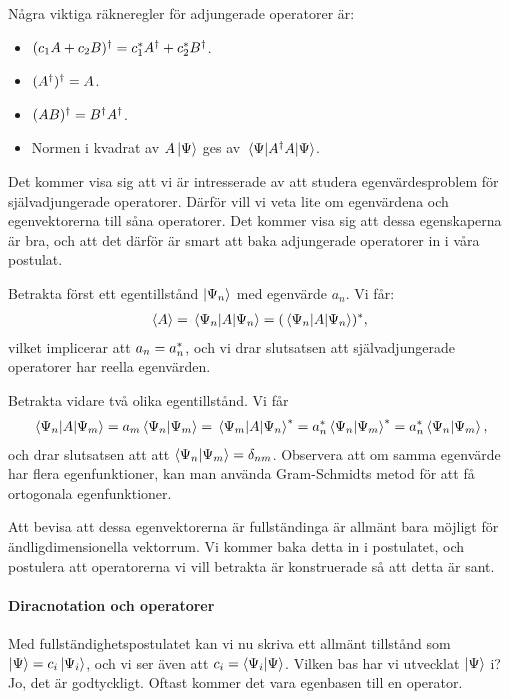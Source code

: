 Några viktiga räkneregler för adjungerade operatorer är:
\begin{itemize}
	\item $(c_{1}A + c_{2}B)^{\dagger} = c_{1}^{*}A^{\dagger} + c_{2}^{*}B^{\dagger}$.
	\item $(A^{\dagger})^{\dagger} = A$.
	\item $(AB)^{\dagger} = B^{\dagger}A^{\dagger}$.
	\item Normen i kvadrat av $A\ket{\Psi}$ ges av $\expval{A^{\dagger}A}{\Psi}$.
\end{itemize}

Det kommer visa sig att vi är intresserade av att studera egenvärdesproblem för självadjungerade operatorer. Därför vill vi veta lite om egenvärdena och egenvektorerna till såna operatorer. Det kommer visa sig att dessa egenskaperna är bra, och att det därför är smart att baka adjungerade operatorer in i våra postulat.

Betrakta först ett egentillstånd $\ket{\Psi_{n}}$ med egenvärde $a_{n}$. Vi får:
\begin{align*}
	\expval{A} = \expval{A}{\Psi_{n}} = (\expval{A}{\Psi_{n}})^{*},
\end{align*}
vilket implicerar att $a_{n} = a_{n}^{*}$, och vi drar slutsatsen att självadjungerade operatorer har reella egenvärden.

Betrakta vidare två olika egentillstånd. Vi får
\begin{align*}
	\mel{\Psi_{n}}{A}{\Psi_{m}} = a_{m}\braket{\Psi_{n}}{\Psi_{m}} = \mel{\Psi_{m}}{A}{\Psi_{n}}^{*} = a_{n}^{*}\braket{\Psi_{n}}{\Psi_{m}}^{*} = a_{n}^{*}\braket{\Psi_{n}}{\Psi_{m}},
\end{align*}
och drar slutsatsen att att $\braket{\Psi_{n}}{\Psi_{m}} = \delta_{nm}$. Observera att om samma egenvärde har flera egenfunktioner, kan man använda Gram-Schmidts metod för att få ortogonala egenfunktioner.

Att bevisa att dessa egenvektorerna är fullständinga är allmänt bara möjligt för ändligdimensionella vektorrum. Vi kommer baka detta in i postulatet, och postulera att operatorerna vi vill betrakta är konstruerade så att detta är sant.

\paragraph{Diracnotation och operatorer}
Med fullständighetspostulatet kan vi nu skriva ett allmänt tillstånd som $\ket{\Psi} = c_{i}\ket{\Psi_{i}}$, och vi ser även att $c_{i} = \braket{\Psi_{i}}{\Psi}$. Vilken bas har vi utvecklat $\ket{\Psi}$ i? Jo, det är godtyckligt. Oftast kommer det vara egenbasen till en operator.

